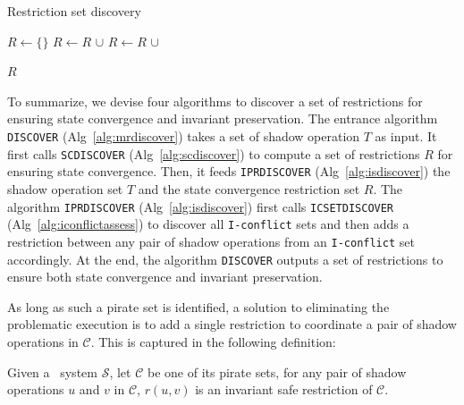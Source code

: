 \begin{algorithm}[t]
\caption{Restriction set discovery}
\label{alg:mrdiscover}
\begin{algorithmic}[1]
\State $R \leftarrow \{ \}$ 
\State $R \leftarrow R$ $\cup $  
\State $R \leftarrow R$ $\cup $  

\Return $R$
\EndFunction
\end{algorithmic}
\end{algorithm}
\fi

To summarize, we devise four algorithms to discover a set of restrictions for ensuring state convergence
and invariant preservation. The entrance algorithm \texttt{DISCOVER} (Alg~\ref{alg:mrdiscover}) takes 
a set of shadow operation $T$ as input. It first
calls \texttt{SCDISCOVER} (Alg~\ref{alg:scdiscover}) to compute a set of restrictions $R$
for ensuring state convergence. Then, it feeds \texttt{IPRDISCOVER} (Alg~\ref{alg:isdiscover}) the shadow operation
set $T$ and the state convergence restriction set $R$. The algorithm \texttt{IPRDISCOVER} (Alg~\ref{alg:isdiscover}) first calls
\texttt{ICSETDISCOVER} (Alg~\ref{alg:iconflictassess}) to discover all {\tt I-conflict} sets and then adds a restriction between any
pair of shadow operations from an {\tt I-conflict} set accordingly. At the end, the algorithm \texttt{DISCOVER} outputs a 
set of restrictions to ensure both state convergence and invariant preservation. 





As long as such a pirate set is identified, a solution to eliminating the 
problematic execution is to add a single restriction
to coordinate a pair of shadow operations in $\mathcal{C}$.
This is captured in the following definition:

\begin{mydef}
 Given a \PRCAJ\ system $\mathscr{S}$, let 
$\mathcal{C}$ be one of
its pirate sets, for any pair of shadow operations $u$ and $v$ in $\mathcal{C}$, 
$r(u, v)$ is an invariant safe restriction of $\mathcal{C}$.
\label{def:saferestric}
\end{mydef}



